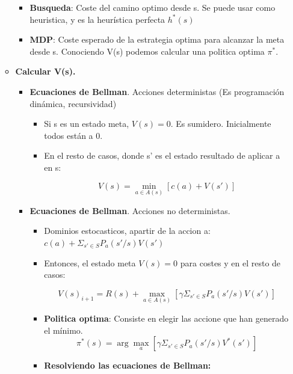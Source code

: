 \documentclass[12pt, twoside, openright]{report} %
\begin{document}
\begin{itemize}
\begin{itemize}
\begin{itemize}
      \item \textbf{Busqueda}: Coste del camino optimo desde s. Se puede
        usar como heuristica, y es la heurística perfecta $h^*(s)$
        
      \item \textbf{MDP}: Coste esperado de la estrategia optima para
        alcanzar la meta desde s. Conociendo V(s) podemos calcular una
        politica optima $\pi^*$.
        
      \end{itemize}
    \item \textbf{Calcular V(s).}
      

      \begin{itemize}
      \item \textbf{Ecuaciones de Bellman}. Acciones deterministas (Es
        programación dinámica, recursividad)
        

        \begin{itemize}
        \item Si s es un estado meta, $V(s) = 0$. Es sumidero. Inicialmente
          todos están a 0.
          
        \item En el resto de casos, donde s' es el estado resultado de
          aplicar a en s:
          
		  $$V(s) = \min_{a\in A(s)} [c(a)+V(s')]$$

        \end{itemize}
      \item \textbf{Ecuaciones de Bellman}. Acciones no deterministas.
        

        \begin{itemize}
        \item Dominios estocasticos, apartir de la accion a: $c(a) + \Sigma_{s'\in S} P_a (s'/s)V(s')$
          
        \item Entonces, el estado meta $V(s)=0$ para costes y en el resto de
          casos:

		  $$V(s)_{i+1}= R(s)+ \max_{a\in A(s)} [\gamma \Sigma_{s'\in S} P_a(s'/s) V(s')]$$
          
        \item \textbf{Politica optima}: Consiste en elegir las accione que
          han generado el mínimo.
          $$\pi^*(s)= \arg \max_{a} [\gamma \Sigma_{s'\in S} P_a(s'/s) V^*(s')]$$

		  \pagebreak
        \item \textbf{Resolviendo las ecuaciones de Bellman:}
          


\end{itemize}
\end{itemize}
\end{itemize}
\end{itemize}
\end{document}
